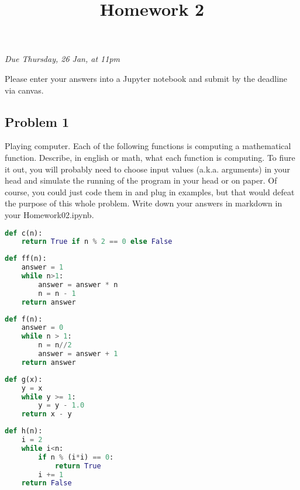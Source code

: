 \documentclass[letterpaper,11pt]{amsart}
\title{Homework 2}
\date{}
\theoremstyle{plain}
\theoremstyle{definition}
\begin{document}
\maketitle
\begin{center}
  \emph{Due Thursday, 26 Jan, at 11pm}
  \vspace{0.3in}
  \end{center}


\noindent Please enter your answers into a Jupyter notebook and submit by the deadline via canvas.

\subsection*{Problem 1} Playing computer. Each of the following functions is computing a mathematical function. Describe, in english or math, what each function is computing. To fiure it out, you will probably need to choose input values (a.k.a. arguments) in your head and simulate the running of the program in your head or on paper. Of course, you could just code them in and plug in examples, but that would defeat the purpose of this whole problem. Write down your answers in markdown in your Homework02.ipynb. 

\begin{lstlisting}[language=Python]
def c(n):
    return True if n % 2 == 0 else False
\end{lstlisting}

\begin{lstlisting}[language=Python]
def ff(n):
    answer = 1
    while n>1:
        answer = answer * n
        n = n - 1
    return answer
\end{lstlisting}

\begin{lstlisting}[language=Python]
def f(n):
    answer = 0
    while n > 1:
        n = n//2
        answer = answer + 1
    return answer
\end{lstlisting}

\begin{lstlisting}[language=Python]
def g(x):   
    y = x
    while y >= 1:
        y = y - 1.0
    return x - y
\end{lstlisting}

\newpage

\begin{lstlisting}[language=Python]
def h(n):
    i = 2
    while i<n:
        if n % (i*i) == 0:
            return True
        i += 1
    return False    
\end{lstlisting}
\end{document}
